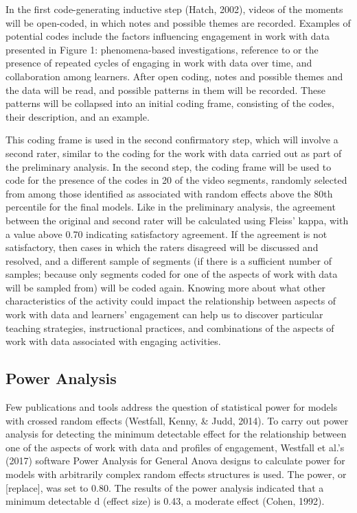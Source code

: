 \documentclass[]{msu-thesis}
\theoremstyle{definition}
\theoremstyle{definition}
\theoremstyle{definition}
\theoremstyle{remark}
\begin{document}
In the first code-generating inductive step (Hatch, 2002), videos of the
moments will be open-coded, in which notes and possible themes are
recorded. Examples of potential codes include the factors influencing
engagement in work with data presented in Figure 1: phenomena-based
investigations, reference to or the presence of repeated cycles of
engaging in work with data over time, and collaboration among learners.
After open coding, notes and possible themes and the data will be read,
and possible patterns in them will be recorded. These patterns will be
collapsed into an initial coding frame, consisting of the codes, their
description, and an example.

This coding frame is used in the second confirmatory step, which will
involve a second rater, similar to the coding for the work with data
carried out as part of the preliminary analysis. In the second step, the
coding frame will be used to code for the presence of the codes in 20 of
the video segments, randomly selected from among those identified as
associated with random effects above the 80th percentile for the final
models. Like in the preliminary analysis, the agreement between the
original and second rater will be calculated using Fleiss' kappa, with a
value above 0.70 indicating satisfactory agreement. If the agreement is
not satisfactory, then cases in which the raters disagreed will be
discussed and resolved, and a different sample of segments (if there is
a sufficient number of samples; because only segments coded for one of
the aspects of work with data will be sampled from) will be coded again.
Knowing more about what other characteristics of the activity could
impact the relationship between aspects of work with data and learners'
engagement can help us to discover particular teaching strategies,
instructional practices, and combinations of the aspects of work with
data associated with engaging activities.

\subsection{Power Analysis}\label{power-analysis}

Few publications and tools address the question of statistical power for
models with crossed random effects (Westfall, Kenny, \& Judd, 2014). To
carry out power analysis for detecting the minimum detectable effect for
the relationship between one of the aspects of work with data and
profiles of engagement, Westfall et al.'s (2017) software Power Analysis
for General Anova designs to calculate power for models with arbitrarily
complex random effects structures is used. The power, or {[}replace{]},
was set to 0.80. The results of the power analysis indicated that a
minimum detectable d (effect size) is 0.43, a moderate effect (Cohen,
1992).
\end{document}
